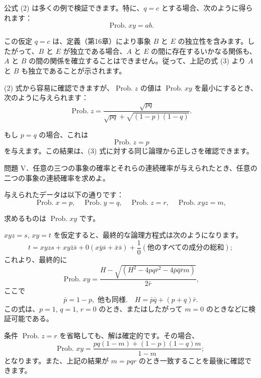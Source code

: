 \documentclass[a4paper,11pt,openany]{ltjsbook}
\begin{document}
公式 (2) は多くの例で検証できます。特に、$q = c$ とする場合、次のように得られます：
\begin{equation*}
\tag{3} \operatorname{Prob.} xy = ab.
\end{equation*}

この仮定 $q = c$ は、定義（第16章）により事象 $B$ と $E$ の独立性を含みます。したがって、$B$ と $E$ が独立である場合、$A$ と $E$ の間に存在するいかなる関係も、$A$ と $B$ の間の関係を確立することはできません。従って、上記の式 (3) より $A$ と $B$ も独立であることが示されます。

(2) 式から容易に確認できますが、$\operatorname{Prob.} z$ の値は $\operatorname{Prob.} xy$ を最小にするとき、次のように与えられます：
\begin{equation*}
\operatorname{Prob.} z = \frac{\sqrt{pq}}{\sqrt{pq} + \sqrt{(1-p)(1-q)}}.
\end{equation*}

もし $p = q$ の場合、これは
\begin{equation*}
\operatorname{Prob.} z = p
\end{equation*}
を与えます。この結果は、(3) 式に対する同じ論理から正しさを確認できます。

問題 V．任意の三つの事象の確率とそれらの連続確率が与えられたとき、任意の二つの事象の連続確率を求めよ。

与えられたデータは以下の通りです：
\begin{equation*}
\operatorname{Prob.} x = p, \quad
\operatorname{Prob.} y = q, \quad
\operatorname{Prob.} z = r, \quad
\operatorname{Prob.} xyz = m,
\end{equation*}

求めるものは $\operatorname{Prob.} xy$ です。

$xyz = s$, $xy = t$ を仮定すると、最終的な論理方程式は次のようになります。
\[
t = xyzs + xy\bar{z}\bar{s} + 0(x\bar{y}\bar{s} + \bar{x}\bar{s}) + \frac{1}{0}(\text{他のすべての成分の総和});
\]
これより、最終的に
\[
\operatorname{Prob. } xy = \frac{H - \sqrt{(H^2 - 4pq\bar{r}^2 - 4\bar{p}\bar{q}\bar{r}m)}}{2\bar{r}},
\]
ここで
\[
\bar{p} = 1 - p, \text{ 他も同様}. \quad H = \bar{p}\bar{q} + (p + q)\bar{r}.
\]
この式は、$p = 1$, $q = 1$, $r = 0$ のとき、またはしたがって $m = 0$ のときなどに検証可能である。

条件 $\operatorname{Prob. } z = r$ を省略しても、解は確定的です。その場合、
\[
\text{Prob. } xy = \frac{pq(1 - m) + (1 - p)(1 - q)m}{1 - m};
\]
となります。また、上記の結果が $m = pqr$ のとき一致することを最後に確認できます。
\end{document}
